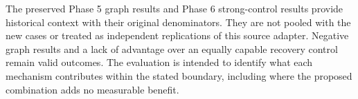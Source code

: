 The preserved Phase 5 graph results and Phase 6 strong-control results provide
historical context with their original denominators. They are not pooled with
the new cases or treated as independent replications of this source adapter.
Negative graph results and a lack of advantage over an equally capable recovery
control remain valid outcomes. The evaluation is intended to identify what each
mechanism contributes within the stated boundary, including where the proposed
combination adds no measurable benefit.
